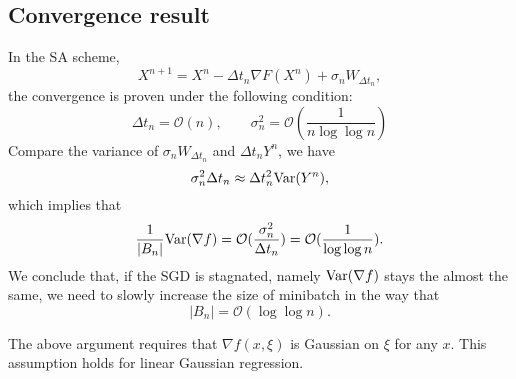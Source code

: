 \subsection{Convergence result}
In the SA scheme, 
\begin{equation} \label{equ:SA}
X^{n+1} = X^n - \Delta t_n \nabla F(X^n) + \sigma_n W_{\Delta t_n},
\end{equation}
the convergence is proven under the following condition: 
$$ 
\Delta t_n = \mathcal{O}(n), \qquad \sigma_n^2 =
\mathcal{O}(\frac{1}{n \log\log n})
$$ 
Compare the variance of $\sigma_n W_{\Delta t_n}$ and $\Delta t_n
Y^n$, we have 
$$ 
\sigma_n^2 \Delta t_n \approx \Delta t_n^2 {\rm Var}(Y^n),
$$ 
which implies that 
$$ 
\frac{1}{|B_n|} {\rm Var}(\nabla f) =
\mathcal{O}(\frac{\sigma_n^2}{\Delta t_n}) =
\mathcal{O}(\frac{1}{\log\log n}).
$$ 
We conclude that, if the SGD is stagnated, namely ${\rm Var}(\nabla
f)$ stays the almost the same, we need to slowly increase the size of
minibatch in the way that 
\begin{equation} \label{equ:batch-size}
|B_n| = \mathcal{O}(\log\log n).
\end{equation}


\begin{remark}
	The above argument requires that $\nabla f(x, \xi)$ is Gaussian on
	$\xi$ for any $x$. This assumption holds for linear Gaussian
	regression. 
\end{remark}
